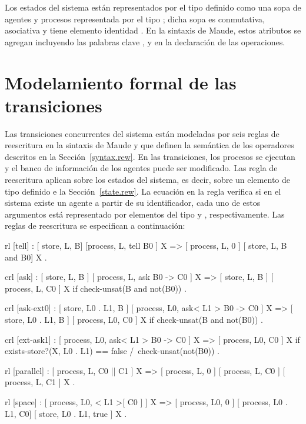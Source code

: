 Los estados del sistema est\'an representados por el tipo  definido como una sopa de agentes y procesos representada por el tipo ; dicha sopa es conmutativa, asociativa y tiene elemento identidad . En la sintaxis de Maude, estos atributos se agregan incluyendo las palabras clave ,  y  en la declaraci\'on de las operaciones. 

\section{Modelamiento formal de las transiciones}
\label{rules.rew}

Las transiciones concurrentes del sistema est\'an modeladas por seis reglas de reescritura en la sintaxis de Maude y que definen la sem\'antica de los operadores descritos en la Secci\'on~\ref{syntax.rew}. En las transiciones, los procesos se ejecutan y el banco de informaci\'on de los agentes puede ser modificado. Las regla de reescritura aplican sobre los estados del sistema, es decir, sobre un elemento de tipo  definido e la Secci\'on~\ref{state.rew}. La ecuaci\'on  en la regla  verifica si en el sistema existe un agente a partir de su identificador, cada uno de estos argumentos est\'a representado por elementos del tipo  y , respectivamente. Las reglas de reescritura se especifican a continuaci\'on: 

\begin{maude}
  rl [tell] :
     { [ store, L, B] [process, L, tell B0 ] X }
  => { [ process, L, 0 ] [ store, L, B and B0] X } .

 crl [ask] :
     { [ store, L, B ] [ process, L, ask B0  -> C0 ] X }
  => { [ store, L, B ] [ process, L, C0 ] X }
  if check-unsat(B and not(B0)) .

 crl [ask-ext0] :
     { [ store, L0 . L1, B ] 
       [ process, L0, ask< L1 > B0  -> C0 ] X }
  => { [ store, L0 . L1, B ] [ process, L0, C0 ] X }
  if check-unsat(B and not(B0)) . 

 crl [ext-ask1] :
     { [ process, L0, ask< L1 > B0  -> C0 ] X }
  => { [ process, L0, C0 ] X }
  if exists-store?(X, L0 . L1) == false
  /\ check-unsat(not(B0)) . 

  rl [parallel] :
     { [ process, L, C0 || C1 ] X }
  => { [ process, L, 0 ] [ process, L, C0 ] 
       [ process, L, C1 ] X } .

  rl [space] :
     { [ process, L0, < L1 >[ C0 ] ] X } 
  => { [ process, L0, 0 ] [ process, L0 . L1, C0] 
       [ store, L0 . L1, true ] X } .
\end{maude}

